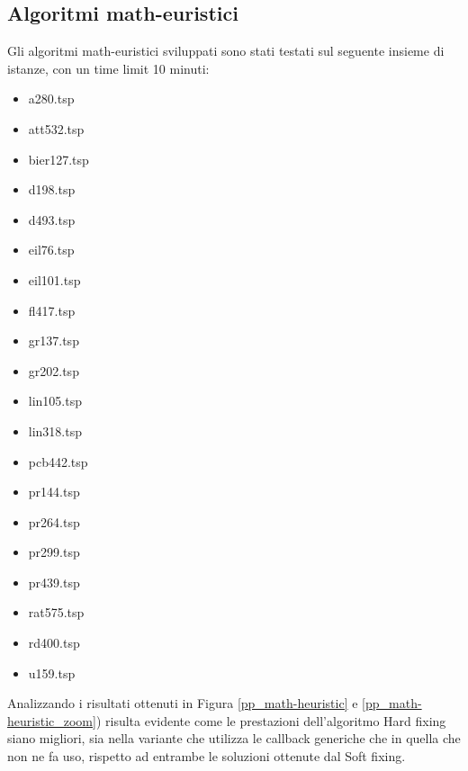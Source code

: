 \vspace{2cm}
\subsection{Algoritmi math-euristici}
Gli algoritmi math-euristici sviluppati sono stati testati sul seguente insieme di istanze, con un time limit 10 minuti:
\begin{center}
\begin{multicols}{3}
\begin{itemize}
\item{a280.tsp}  
\item{att532.tsp} 
\item{bier127.tsp}
\item{d198.tsp}   
\item{d493.tsp}   
\item{eil76.tsp}  
\item{eil101.tsp} 
\item{fl417.tsp}  
\item{gr137.tsp}  
\item{gr202.tsp}  
\item{lin105.tsp} 
\item{lin318.tsp} 
\item{pcb442.tsp} 
\item{pr144.tsp}  
\item{pr264.tsp}  
\item{pr299.tsp}  
\item{pr439.tsp}  
\item{rat575.tsp} 
\item{rd400.tsp}  
\item{u159.tsp}
\end{itemize}
\end{multicols}
\end{center}
Analizzando i risultati ottenuti in Figura \ref{pp_math-heuristic} e \ref{pp_math-heuristic_zoom}) risulta evidente come le prestazioni dell'algoritmo Hard fixing siano migliori, sia nella variante che utilizza le callback generiche che in quella che non ne fa uso, rispetto ad entrambe le soluzioni ottenute dal Soft fixing.
